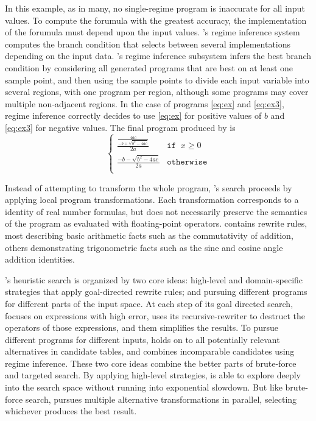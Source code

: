 \documentclass[paper.tex]{subfiles}
\begin{document}
In this example, as in many, no single-regime program is inaccurate
for all input values.  To compute the forumula with the greatest
accuracy, the implementation of the forumula must depend upon the
input values.  \casio's regime inference system computes the branch
condition that selects between several implementations depending on
the input data.  \casio's regime inference subsystem infers the best
branch condition by considering all generated programs that are best
on at least one sample point, and then using the sample points to
divide each input variable into several regions, with one program per
region, although some programs may cover multiple non-adjacent
regions.  In the case of programs \eqref{eq:ex} and \eqref{eq:ex3},
regime inference correctly decides to use \eqref{eq:ex} for positive
values of $b$ and \eqref{eq:ex3} for negative values.  The final
program produced by \casio is
\[
\begin{cases}
  \frac{\frac{4ac}
             {-b + \sqrt{b^2 - 4ac}}}
       {2a} & \mathtt{if} \;\; x \ge 0 \\[8pt]
  \frac{-b - \sqrt{b^2 - 4ac}}
       {2a} & \mathtt{otherwise} \\
\end{cases}
\]

Instead of attempting to transform the whole program, \casio's search
proceeds by applying local program transformations.  
Each transformation corresponds to a identity of real number formulas,
but does not necessarily preserve the semantics of the program as
evaluated with floating-point operators.  \casio contains \nRewrites
rewrite rules, most describing basic arithmetic facts such as the
commutativity of addition, others demonstrating trigonometric facts
such as the sine and cosine angle addition identities.

\casio's heuristic search is organized by two core ideas: high-level
and domain-specific strategies that apply goal-directed rewrite rules;
and pursuing different programs for different parts of the input
space.  At each step of its goal directed search, \casio focuses on
expressions with high error, uses its recursive-rewriter to destruct
the operators of those expressions, and them simplifies the results.
To pursue different programs for different inputs, \casio holds on to
all potentially relevant alternatives in candidate tables, and combines
incomparable candidates using regime inference.  These two core ideas
combine the better parts of brute-force and targeted search.  By
applying high-level strategies, \casio is able to explore deeply into
the search space without running into exponential slowdown.  But like
brute-force search, \casio pursues multiple alternative
transformations in parallel, selecting whichever produces the best
result.
\end{document}
